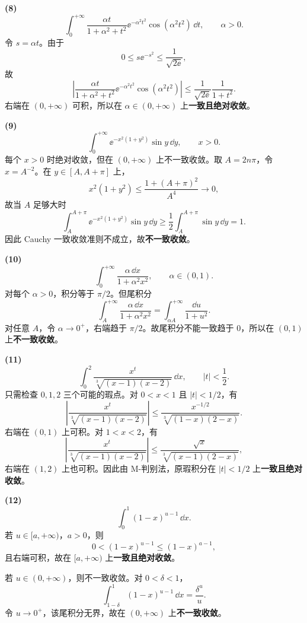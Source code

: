 \begin{xsolution}
\textbf{(8)}
\[
\int_0^{+\infty}\frac{\alpha t}{1+\alpha^2+t^2}
\ee^{-\alpha^2t^2}\cos(\alpha^2t^2)\,\dd t,
\qquad \alpha>0.
\]
令 $s=\alpha t$。由于
\[
0\leqslant s\ee^{-s^2}\leqslant\frac1{\sqrt{2\ee}},
\]
故
\[
\left|
\frac{\alpha t}{1+\alpha^2+t^2}
\ee^{-\alpha^2t^2}\cos(\alpha^2t^2)
\right|
\leqslant\frac1{\sqrt{2\ee}}\frac1{1+t^2}.
\]
右端在 $(0,+\infty)$ 可积，所以在 $\alpha\in(0,+\infty)$ 上\textbf{一致且绝对收敛}。

\textbf{(9)}
\[
\int_0^{+\infty}\ee^{-x^2(1+y^2)}\sin y\,\dd y,
\qquad x>0.
\]
每个 $x>0$ 时绝对收敛，但在 $(0,+\infty)$ 上不一致收敛。取 $A=2n\pi$，令 $x=A^{-2}$。在 $y\in[A,A+\pi]$ 上，
\[
x^2(1+y^2)\leqslant\frac{1+(A+\pi)^2}{A^4}\to0,
\]
故当 $A$ 足够大时
\[
\int_A^{A+\pi}\ee^{-x^2(1+y^2)}\sin y\,\dd y
\geqslant\frac12\int_A^{A+\pi}\sin y\,\dd y=1.
\]
因此 Cauchy 一致收敛准则不成立，故\textbf{不一致收敛}。

\textbf{(10)}
\[
\int_0^{+\infty}\frac{\alpha\,\dd x}{1+\alpha^2x^2},
\qquad \alpha\in(0,1).
\]
对每个 $\alpha>0$，积分等于 $\pi/2$。但尾积分
\[
\int_A^{+\infty}\frac{\alpha\,\dd x}{1+\alpha^2x^2}
=\int_{\alpha A}^{+\infty}\frac{\dd u}{1+u^2}.
\]
对任意 $A$，令 $\alpha\to0^+$，右端趋于 $\pi/2$。故尾积分不能一致趋于 $0$，所以在 $(0,1)$ 上\textbf{不一致收敛}。

\textbf{(11)}
\[
\int_0^2\frac{x^t}{\sqrt[3]{(x-1)(x-2)}}\,\dd x,
\qquad |t|<\frac12.
\]
只需检查 $0,1,2$ 三个可能的瑕点。对 $0<x<1$ 且 $|t|<1/2$，有
\[
\left|\frac{x^t}{\sqrt[3]{(x-1)(x-2)}}\right|
\leqslant
\frac{x^{-1/2}}{\sqrt[3]{(1-x)(2-x)}}.
\]
右端在 $(0,1)$ 上可积。对 $1<x<2$，有
\[
\left|\frac{x^t}{\sqrt[3]{(x-1)(x-2)}}\right|
\leqslant
\frac{\sqrt{x}}{\sqrt[3]{(x-1)(2-x)}},
\]
右端在 $(1,2)$ 上也可积。因此由 M-判别法，原瑕积分在 $|t|<1/2$ 上\textbf{一致且绝对收敛}。

\textbf{(12)}
\[
\int_0^1(1-x)^{u-1}\,\dd x.
\]
若 $u\in[a,+\infty)$，$a>0$，则
\[
0<(1-x)^{u-1}\leqslant(1-x)^{a-1},
\]
且右端可积，故在 $[a,+\infty)$ 上\textbf{一致且绝对收敛}。

若 $u\in(0,+\infty)$，则不一致收敛。对 $0<\delta<1$，
\[
\int_{1-\delta}^1(1-x)^{u-1}\,\dd x=\frac{\delta^u}{u}.
\]
令 $u\to0^+$，该尾积分无界，故在 $(0,+\infty)$ 上\textbf{不一致收敛}。
\end{xsolution}


